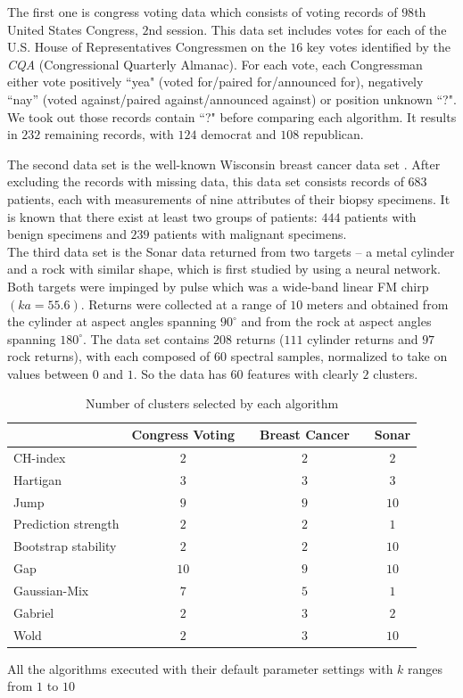 \documentclass[11pt]{article}
\begin{document}
The first one is congress voting data which consists of voting records of
$98$th United States Congress, $2$nd session. This data set includes votes for
each of the U.S. House of Representatives Congressmen on the $16$ key votes
identified by the \textit{CQA} (Congressional Quarterly Almanac). For each
vote, each Congressman either vote positively ``yea" (voted for/paired
for/announced for),  negatively ``nay'' (voted against/paired
against/announced against) or position unknown ``?". We took out those records
contain ``?" before comparing each algorithm. It results in $232$ remaining
records, with $124$ democrat and $108$ republican. 


The second data set is the well-known Wisconsin breast cancer data set \citep{mangasarian1990pattern}. After excluding the records with missing data, this data set consists records of $683$ patients, each with measurements of nine attributes of their biopsy specimens. It is known that there exist at least two groups of patients: $444$ patients with benign specimens and $239$ patients with malignant specimens.\\

The third data set is the Sonar data returned from two targets -- a metal
cylinder and a rock with similar shape, which is first studied by
\cite{gorman1988analysis} using a neural network. Both targets were impinged
by pulse which was a wide-band linear FM chirp $(ka = 55.6)$. Returns were
collected at a range of $10$ meters and obtained from the cylinder at aspect
angles spanning $90^{\circ}$ and from the rock at aspect angles spanning
$180^{\circ}$. The data set contains $208$ returns ($111$ cylinder returns and
$97$ rock returns), with each composed of $60$ spectral samples, normalized to
take on values between $0$ and $1$. So the data has $60$ features with clearly
$2$ clusters. 


\begin{table}[H]
\begin{center}
\caption{\label{table2} Number of clusters selected by each algorithm}
\begin{tabular}{lccccc}
    \hline                  
 & Congress Voting && Breast Cancer && Sonar \\ \hline                    
CH-index & $2$ && $2$  && $2$    \\
Hartigan & $3$ && $3$  &&  $3$   \\
Jump & $9$ && $9$ && $10$  \\   
Prediction strength & $2$ &&  $2$ && $1$    \\
Bootstrap stability & $2$ &&  $2$ &&  $10$   \\ 
Gap & $10$ && $9$ && $10$  \\   
Gaussian-Mix & $7$ && $5$ && $1$  \\   
Gabriel & $2$  && $3$  && $2$  \\    
Wold & $2$ && $3$ && $10$ \\  \hline 
\end{tabular}
\end{center}
\hspace{0.5in} \footnotesize {All the algorithms executed with their default parameter settings with $k$ ranges from $1$ to $10$}
\end{table} 
\end{document}
